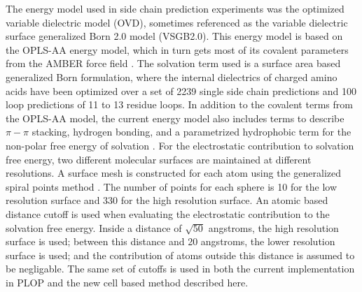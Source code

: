 The energy model used in side chain prediction experiments was the optimized variable dielectric model (OVD), sometimes referenced as the variable dielectric surface generalized Born 2.0 model (VSGB2.0).
This energy model is based on the OPLS-AA energy model, which in turn gets most of its covalent parameters from the AMBER force field \cite{jorgensen1996development}.
The solvation term used is a surface area based generalized Born formulation, where the internal dielectrics of charged amino acids have been optimized over a set of 2239 single side chain predictions and 100 loop predictions of 11 to 13 residue loops.
In addition to the covalent terms from the OPLS-AA model, the current energy model also includes terms to describe $\pi-\pi$ stacking, hydrogen bonding, and a parametrized hydrophobic term for the non-polar free energy of solvation \cite{li2011vsgb}.
For the electrostatic contribution to solvation free energy, two different molecular surfaces are maintained at different resolutions.
A surface mesh is constructed for each atom using the generalized spiral points method \cite{rakhmanov1994minimal,saff1997distributing,zhou1995arrangements}.
The number of points for each sphere is 10 for the low resolution surface and 330 for the high resolution surface.
An atomic based distance cutoff is used when evaluating the electrostatic contribution to the solvation free energy.
Inside a distance of $\sqrt{50}$ angstroms, the high resolution surface is used; between this distance and 20 angstroms, the lower resolution surface is used; and the contribution of atoms outside this distance is assumed to be negligable.
The same set of cutoffs is used in both the current implementation in PLOP and the new cell based method described here.
